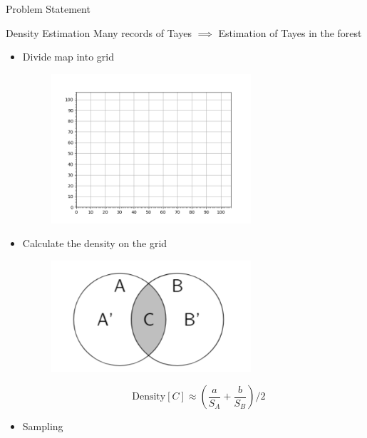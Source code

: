 \documentclass[final]{beamer}
\begin{document}
\begin{frame}
\begin{columns}[t]
\begin{column}{\colwidth}
\begin{tcolorbox}[width=\colwidth,height=\contentheight,top=.2in]
\begin{block}{Problem Statement}
\end{block}

\vspace{.2in}

\begin{block}{Density Estimation}
    Many records of Tayes $\implies$ Estimation of Tayes in the forest\\
    
    \begin{itemize}
        \item Divide map into grid 
        \begin{figure}[H]
        \includegraphics[width=0.7\textwidth]{grid}
        \end{figure}
        \item Calculate the density on the grid
        \begin{figure}[H]
        \includegraphics[width=0.7\textwidth]{circle.png}
        \end{figure}
        $$\quad\text{Density}[C]\approx\left(\frac{a}{S_A}+\frac{b}{S_B}\right)/2$$
        \item Sampling
    \end{itemize}
   



\end{block}
\end{tcolorbox}
\end{column}
\end{columns}
\end{frame}
\end{document}
